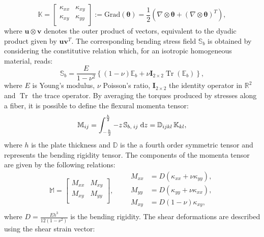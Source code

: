 \documentclass[11t]{article}
\DeclareMathOperator{\Tr}{Tr}
\begin{document}
{		\begin{equation}
		\mathbb{K} = \begin{bmatrix}
		\kappa_{xx} &  \kappa_{xy}\\
		\kappa_{xy} & \kappa_{yy} \\
		\end{bmatrix} := \mathrm{Grad}(\bm{\theta}) =  \frac{1}{2} \left(\nabla \otimes \bm{\theta} + \left(\nabla \otimes \bm{\theta}\right)^T \right),
		\end{equation}
		where $\bm{u} \otimes {\bm{v}}$ denotes the outer product of vectors, equivalent to the dyadic product given by $\bm{u}\bm{v}^T$. The corresponding bending  stress field $\mathbb{S}_b$ is obtained by considering the constitutive relation which, for an isotropic homogeneous material, reads:
		\begin{equation}
		\mathbb{S}_{b} = \frac{E}{1-\nu^2} \left\{ (1-\nu) \mathbb{E}_b +\nu \bm{I}_{2 \times 2} \Tr(\mathbb{E}_b) \right\},
		\end{equation}
		where $E$ is Young's modulus, $\nu$ Poisson's ratio, $\bm{I}_{2 \times 2}$ the identity operator in $\mathbb{R}^2$ and $\Tr$ the trace operator. By averaging the torques produced by stresses along a fiber, it is possible to define the flexural momenta tensor:
		\begin{equation}
		\mathbb{M}_{ij} = \int_{-\frac{h}{2} }^{ \frac{h}{2} } -z \, \mathbb{S}_{b, \; ij} \d z = \mathbb{D}_{ijkl} \,  \mathbb{K}_{kl}, 
		\end{equation}
		where $h$ is the plate thickness and $\mathbb{D}$ is the a fourth order symmetric tensor and represents the bending rigidity tensor. The components of the momenta tensor are given by the following relations:
		\begin{equation}
		\mathbb{M} = \begin{bmatrix}
		M_{xx} &  M_{xy}\\
		M_{xy} &  M_{yy} \\
		\end{bmatrix},  \qquad 
		\begin{aligned}
		M_{xx} &= D\left(\kappa_{xx} + \nu \kappa_{yy} \right),\\
		M_{yy} &= D\left(\kappa_{yy} + \nu \kappa_{xx} \right),\\
		M_{xy} &= D\left(1 - \nu \right) \kappa_{xy}, \\
		\end{aligned} 
		\end{equation}
		where $D = \frac{E h^3}{12 (1 - \nu^2)}$ is the bending rigidity. The shear deformations are described using the shear strain vector:
}
\end{document}
